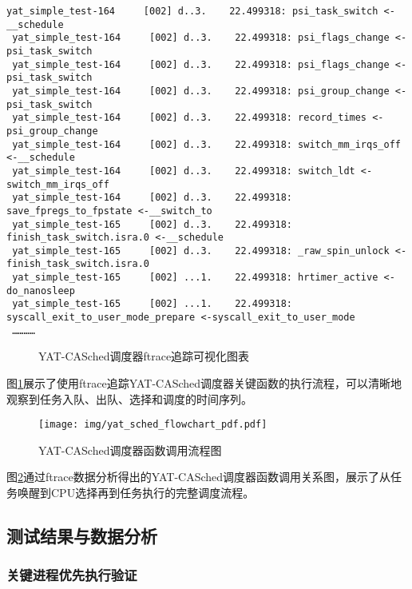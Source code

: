 \begin{tcolorbox}
\begin{lstlisting}[basicstyle=\footnotesize\fontfamily{zi4}\selectfont, showstringspaces=false]
 yat_simple_test-164     [002] d..3.    22.499318: psi_task_switch <-__schedule
 yat_simple_test-164     [002] d..3.    22.499318: psi_flags_change <-psi_task_switch
 yat_simple_test-164     [002] d..3.    22.499318: psi_flags_change <-psi_task_switch
 yat_simple_test-164     [002] d..3.    22.499318: psi_group_change <-psi_task_switch
 yat_simple_test-164     [002] d..3.    22.499318: record_times <-psi_group_change
 yat_simple_test-164     [002] d..3.    22.499318: switch_mm_irqs_off <-__schedule
 yat_simple_test-164     [002] d..3.    22.499318: switch_ldt <-switch_mm_irqs_off
 yat_simple_test-164     [002] d..3.    22.499318: save_fpregs_to_fpstate <-__switch_to
 yat_simple_test-165     [002] d..3.    22.499318: finish_task_switch.isra.0 <-__schedule
 yat_simple_test-165     [002] d..3.    22.499318: _raw_spin_unlock <-finish_task_switch.isra.0
 yat_simple_test-165     [002] ...1.    22.499318: hrtimer_active <-do_nanosleep
 yat_simple_test-165     [002] ...1.    22.499318: syscall_exit_to_user_mode_prepare <-syscall_exit_to_user_mode
 …………
\end{lstlisting}
\end{tcolorbox}

\begin{figure}[H]
\centering
\caption{YAT-CASched调度器ftrace追踪可视化图表}
\label{fig:ftrace-trace}
\end{figure}

图\ref{fig:ftrace-trace}展示了使用ftrace追踪YAT-CASched调度器关键函数的执行流程，可以清晰地观察到任务入队、出队、选择和调度的时间序列。

\begin{figure}[H]
\centering
\texttt{[image: img/yat\_sched\_flowchart\_pdf.pdf]}
\caption{YAT-CASched调度器函数调用流程图}
\label{fig:scheduler-flow}
\end{figure}

图\ref{fig:scheduler-flow}通过ftrace数据分析得出的YAT-CASched调度器函数调用关系图，展示了从任务唤醒到CPU选择再到任务执行的完整调度流程。

\subsection{测试结果与数据分析}

\subsubsection{关键进程优先执行验证}

